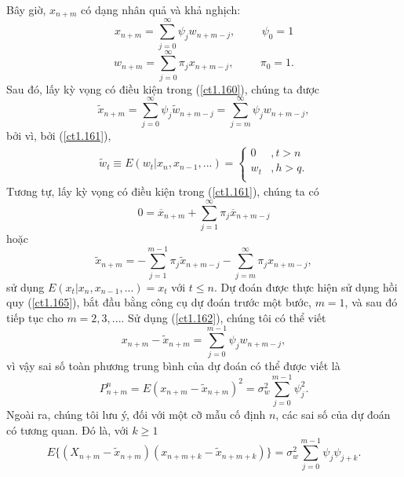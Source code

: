 \documentclass[12pt, a4paper,oneside]{book}
\theoremstyle{definition}
\begin{document}
Bây giờ, $x_{n+m}$ có dạng nhân quả và khả nghịch:
\begin{equation}
x_{n+m}= \sum_{j=0}^{\infty} \psi_{j}w_{n+m-j}, \hspace{1cm} \psi_{0}=1 \label{ct1.160}
\end{equation}
\begin{equation}
w_{n+m}= \sum_{j=0}^{\infty} \pi_{j}x_{n+m-j}, \hspace{1cm} \pi_{0}=1. \label{ct1.161}
\end{equation}
Sau đó, lấy kỳ vọng có điều kiện trong (\ref{ct1.160}), chúng ta được
\begin{equation}
\tilde{x}_{n+m} =\sum_{j=0}^{\infty}\psi_{j}\tilde{w}_{n+m-j} = \sum_{j=m}^{\infty}\psi_jw_{n+m-j},\label{ct1.162}
\end{equation}
bởi vì, bởi (\ref{ct1.161}),
\begin{align*}
\tilde{w}_{t}\equiv E(w_{t}|x_{n},x_{n-1},...) = 
\begin{cases} 
0&, t>n\\
w_t&, h > q.\\
\end{cases}
\end{align*}
Tương tự, lấy kỳ vọng có điều kiện trong (\ref{ct1.161}), chúng ta có
$$0 = \overline{x}_{n+m} + \sum_{j=1}^{\infty} \pi_{j}\overline{x}_{n+m-j}$$
hoặc
\begin{equation}
\tilde{x}_{n+m} = -\sum_{j=1}^{m-1}\pi_{j}\tilde{x}_{n+m-j}- \sum_{j=m}^{\infty}\pi_{j}x_{n+m-j}, \label{ct1.165}
\end{equation}
sử dụng $E(x_{t}|x_{n},x_{n-1},...)= x_{t}$ với $t \leq n$. Dự đoán được thực hiện sử dụng hồi quy (\ref{ct1.165}), bắt đầu bằng công cụ dự đoán trước một bước, $m = 1$, và sau đó tiếp tục cho $m = 2,3,...$. Sử dụng (\ref{ct1.162}), chúng tôi có thể viết
$$x_{n+m} - \tilde{x}_{n+m} = \sum_{j=0}^{m-1}\psi_{j}w_{n+m-j},$$
vì vậy sai số toàn phương trung bình của dự đoán có thể được viết là
\begin{equation}
P_{n+m}^{n}= E(x_{n+m} - \tilde{x}_{n+m})^{2}= \sigma^{2}_{w} \sum_{j=0}^{m-1}\psi_{j}^{2}. \label{ct1.167}
\end{equation}
Ngoài ra, chúng tôi lưu ý, đối với một cỡ mẫu cố định $n$, các sai số của dự đoán có tương quan. Đó là, với $ k\geq 1$
\begin{equation}
E\{(X_{n+m}- \tilde{x}_{n+m})(x_{n+m+k} - \tilde{x}_{n+m+k})\}= \sigma_{w}^{2}\sum_{j=0}^{m-1}\psi_{j}\psi_{j+k}. \label{ct1.168}
\end{equation}
\end{document}
